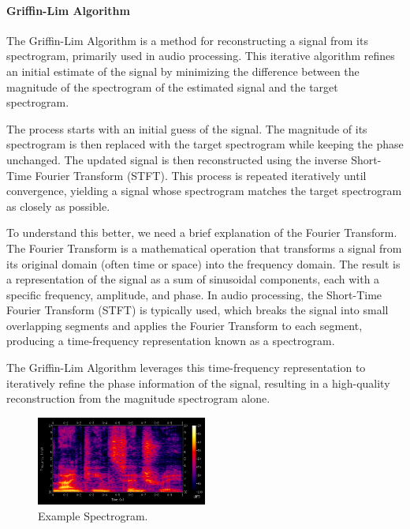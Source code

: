 \paragraph{Griffin-Lim Algorithm}\mbox{}

The Griffin-Lim Algorithm is a method for reconstructing a signal from its spectrogram, primarily used in audio processing. This iterative algorithm refines an initial estimate of the signal by minimizing the difference between the magnitude of the spectrogram of the estimated signal and the target spectrogram.

The process starts with an initial guess of the signal. The magnitude of its spectrogram is then replaced with the target spectrogram while keeping the phase unchanged. The updated signal is then reconstructed using the inverse Short-Time Fourier Transform (STFT). This process is repeated iteratively until convergence, yielding a signal whose spectrogram matches the target spectrogram as closely as possible.

To understand this better, we need a brief explanation of the Fourier Transform. The Fourier Transform is a mathematical operation that transforms a signal from its original domain (often time or space) into the frequency domain. The result is a representation of the signal as a sum of sinusoidal components, each with a specific frequency, amplitude, and phase. In audio processing, the Short-Time Fourier Transform (STFT) is typically used, which breaks the signal into small overlapping segments and applies the Fourier Transform to each segment, producing a time-frequency representation known as a spectrogram.

The Griffin-Lim Algorithm leverages this time-frequency representation to iteratively refine the phase information of the signal, resulting in a high-quality reconstruction from the magnitude spectrogram alone.

\begin{figure}[h]
\centering
\includegraphics[width=0.5\textwidth]{spectrogram.png}
\caption{Example Spectrogram.}
\label{fig:cbhg_module}
\end{figure}

